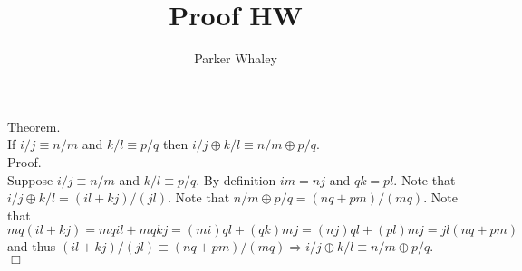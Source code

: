 \documentclass[12pt,a4paper]{article}
\author{Parker Whaley}
\title{Proof HW}
\begin{document}
\maketitle
Theorem.\\
If $i/j\equiv n/m$ and $k/l\equiv p/q$ then $i/j \oplus k/l \equiv n/m \oplus p/q$.\\
Proof.\\
Suppose $i/j\equiv n/m$ and $k/l\equiv p/q$.  By definition $im=nj$ and $qk=pl$.  Note that $i/j \oplus k/l = (il+kj)/(jl)$.  Note that $n/m \oplus p/q=(nq+pm)/(mq)$.  Note that $mq(il+kj)=mqil+mqkj=(mi)ql+(qk)mj=(nj)ql+(pl)mj=jl(nq+pm)$ and thus $(il+kj)/(jl) \equiv (nq+pm)/(mq) \Rightarrow i/j \oplus k/l \equiv n/m \oplus p/q$.\\ $\Box$
\end{document}
